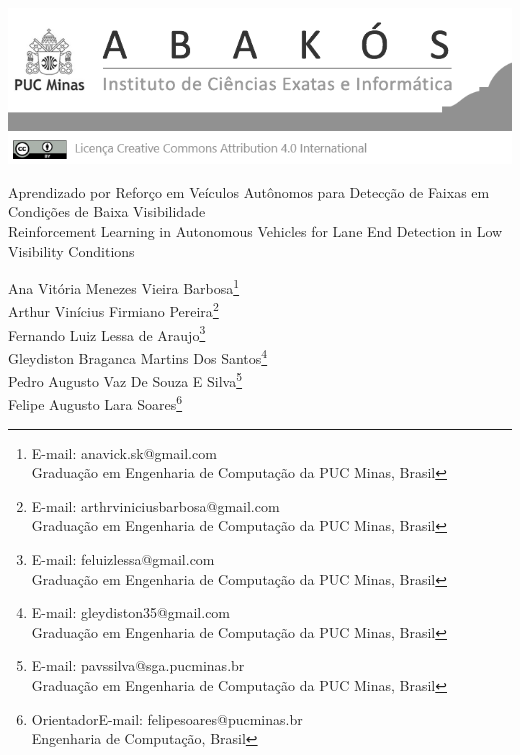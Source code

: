 \documentclass[a4paper,12pt,Times]{article}
\makeatletter
\newcommand{\monog}{Aprendizado por Reforço em Veículos Autônomos para Detecção de Faixas em Condições de Baixa Visibilidade}
\newcommand{\monogES}{Reinforcement Learning in Autonomous Vehicles for Lane End Detection in Low Visibility Conditions}
\newcommand{\origem}{Brasil}
\newcommand{\AutorA}{Ana Vitória Menezes Vieira Barbosa}
\newcommand{\funcaoA}{}
\newcommand{\emailA}{anavick.sk@gmail.com}
\newcommand{\cursA}{Graduação em Engenharia de Computação da PUC Minas}
\newcommand{\AutorB}{Arthur Vinícius Firmiano Pereira}
\newcommand{\funcaoB}{}
\newcommand{\emailB}{arthrviniciusbarbosa@gmail.com}
\newcommand{\cursB}{Graduação em Engenharia de Computação da PUC Minas}
\newcommand{\AutorC}{Fernando Luiz Lessa de Araujo}
\newcommand{\funcaoC}{}
\newcommand{\emailC}{feluizlessa@gmail.com}
\newcommand{\cursC}{Graduação em Engenharia de Computação da PUC Minas}
\newcommand{\AutorD}{Gleydiston Braganca Martins Dos Santos}
\newcommand{\funcaoD}{}
\newcommand{\emailD}{gleydiston35@gmail.com}
\newcommand{\cursD}{Graduação em Engenharia de Computação da PUC Minas}
\newcommand{\AutorE}{Pedro Augusto Vaz De Souza E Silva}
\newcommand{\funcaoE}{}
\newcommand{\emailE}{pavssilva@sga.pucminas.br}
\newcommand{\cursE}{Graduação em Engenharia de Computação da PUC Minas}
\newcommand{\AutorF}{Felipe Augusto Lara Soares}
\newcommand{\funcaoF}{Orientador}
\newcommand{\emailF}{felipesoares@pucminas.br}
\newcommand{\cursF}{Engenharia de Computação}
\makeatother
\begin{document}

\begin{flushleft}

\begin{minipage}[c][5cm][b]{\textwidth}
  \centering
  \includegraphics[width=\linewidth]{figuras/pucmg.png} 
\end{minipage}

 \vspace{0cm} {
 \singlespacing \Large{\monog {} \\ }
  \normalsize{\monogES}
 }
\end{flushleft}
\begin{flushright}
\singlespacing

\footnotesize{\AutorA \footnote{\funcaoA E-mail: \emailA \\ \cursA, \origem}} \\
\footnotesize{\AutorB \footnote{\funcaoB E-mail: \emailB \\ \cursB, \origem}} \\
\footnotesize{\AutorC \footnote{\funcaoC E-mail: \emailC \\ \cursC, \origem}} \\
\footnotesize{\AutorD \footnote{\funcaoD E-mail: \emailD \\ \cursD, \origem}} \\
\footnotesize{\AutorE \footnote{\funcaoE E-mail: \emailE \\ \cursE, \origem}} \\
\footnotesize{\AutorF \footnote{\funcaoF E-mail: \emailF \\ \cursF, \origem}} \\
\end{flushright}
\thispagestyle{empty}
\end{document}

